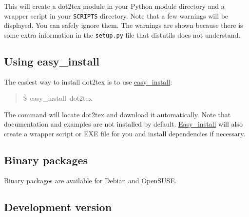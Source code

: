 \documentclass[10pt,a4paper,english]{article}
\begin{document}
This will create a dot2tex module in your Python module directory and a wrapper script in your \texttt{SCRIPTS} directory. Note that a few warnings will be displayed. You can safely ignore them. The warnings are shown because there is some extra information in the \texttt{setup.py} file that distutils does not understand.



\hypertarget{using-easy-install}{}
\subsection*{Using easy{\_}install}
\label{using-easy-install}

The easiest way to install dot2tex is to use \href{http://peak.telecommunity.com/DevCenter/EasyInstall}{easy{\_}install}:
\begin{quote}{\ttfamily \raggedright \noindent
{\$}~easy{\_}install~dot2tex
}\end{quote}

The command will locate dot2tex and download it automatically. Note that documentation and examples are not installed by default. \href{http://peak.telecommunity.com/DevCenter/EasyInstall}{Easy{\_}install} will also create a wrapper script or EXE file for you and install dependencies if necessary.



\hypertarget{binary-packages}{}
\subsection*{Binary packages}
\label{binary-packages}

Binary packages are available for \href{http://packages.qa.debian.org/d/dot2tex.html}{Debian} and \href{http://download.opensuse.org/repositories/home:/jimfunk/}{OpenSUSE}.



\hypertarget{development-version}{}
\subsection*{Development version}
\label{development-version}
\end{document}
